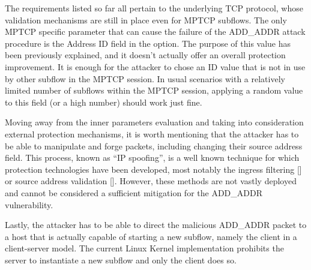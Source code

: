 The requirements listed so far all pertain to the underlying TCP protocol, whose validation mechanisms are still in place even for MPTCP subflows. The only MPTCP specific parameter that can cause the failure of the ADD\_ADDR attack procedure is the Address ID field in the option. The purpose of this value has been previously explained, and it doesn't actually offer an overall protection improvement. It is enough for the attacker to chose an ID value that is not in use by other subflow in the MPTCP session. In usual scenarios with a relatively limited number of subflows within the MPTCP session, applying a random value to this field (or a high number) should work just fine.

Moving away from the inner parameters evaluation and taking into consideration external protection mechanisms, it is worth mentioning that the attacker has to be able to manipulate and forge packets, including changing their source address field. This process, known as ``IP spoofing'', is a well known technique for which protection technologies have been developed, most notably the ingress filtering [] or source address validation []. However, these methods are not vastly deployed and cannot be considered a sufficient mitigation for the ADD\_ADDR vulnerability. %

Lastly, the attacker has to be able to direct the malicious ADD\_ADDR packet to a host that is actually capable of starting a new subflow, namely the client in a client-server model. The current Linux Kernel implementation prohibits the server to instantiate a new subflow and only the client does so.
